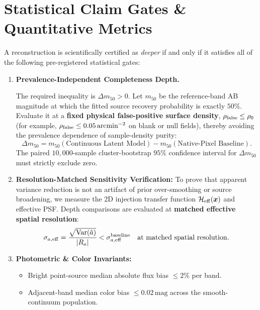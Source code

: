 \documentclass[11pt,a4paper]{article}
\begin{document}
\section{Statistical Claim Gates \& Quantitative Metrics}
\label{sec:gates}

A reconstruction is scientifically certified as \emph{deeper} if and only if it satisfies all of the following pre-registered statistical gates:

\begin{enumerate}
    \item \textbf{Prevalence-Independent Completeness Depth.}\par
    The required inequality is $\Delta m_{50} > 0$.  Let $m_{50}$ be the
    reference-band AB magnitude at which the fitted source
    recovery probability is exactly $50\%$.  Evaluate it at a
    \textbf{fixed physical false-positive surface density},
    $\rho_{\rm false} \le \rho_0$ (for example,
    $\rho_{\rm false} \le 0.05\,\mathrm{arcmin^{-2}}$ on blank or null fields),
    thereby avoiding the prevalence dependence of sample-density purity:
    \begin{equation}
    \Delta m_{50} = m_{50}(\text{Continuous Latent Model}) - m_{50}(\text{Native-Pixel Baseline}).
    \end{equation}
    The paired $10{,}000$-sample cluster-bootstrap $95\%$ confidence interval for $\Delta m_{50}$ must strictly exclude zero.
    \item \textbf{Resolution-Matched Sensitivity Verification:}
    To prove that apparent variance reduction is not an artifact of prior over-smoothing or source broadening, we measure the 2D injection transfer function $\mathcal{H}_{\rm eff}(\boldsymbol{x})$ and effective PSF. Depth comparisons are evaluated at \textbf{matched effective spatial resolution}:
    \begin{equation}
    \sigma_{a, \rm eff} = \frac{\sqrt{\mathrm{Var}(\hat{a})}}{|R_a|} < \sigma_{a, \rm eff}^{\rm baseline} \quad \text{at matched spatial resolution}.
    \end{equation}
    \item \textbf{Photometric \& Color Invariants:}
    \begin{itemize}
        \item Bright point-source median absolute flux bias $\le 2\%$ per band.
        \item Adjacent-band median color bias $\le 0.02\,\mathrm{mag}$ across the smooth-continuum population.
    \end{itemize}

\end{enumerate}
\end{document}

